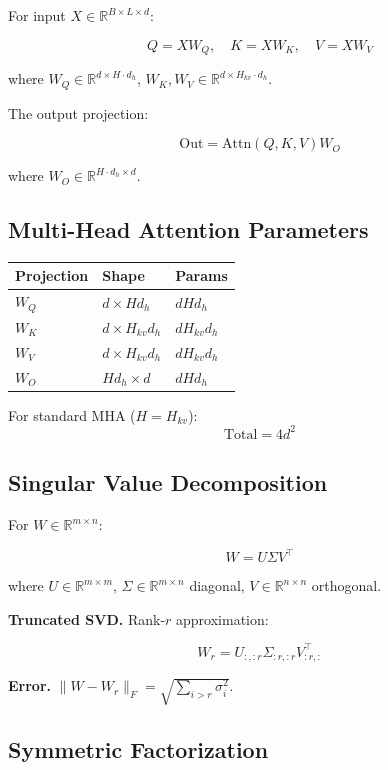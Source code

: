For input $X \in \mathbb{R}^{B \times L \times d}$:

\[
Q = X W_Q, \quad K = X W_K, \quad V = X W_V
\]

where $W_Q \in \mathbb{R}^{d \times H \cdot d_h}$, $W_K, W_V \in \mathbb{R}^{d \times H_{kv} \cdot d_h}$.

The output projection:

\[
\text{Out} = \text{Attn}(Q, K, V) W_O
\]

where $W_O \in \mathbb{R}^{H \cdot d_h \times d}$.

\subsection{Multi-Head Attention Parameters}

\begin{table}[H]
\centering
\small
\begin{tabular}{lll}
\toprule
\textbf{Projection} & \textbf{Shape} & \textbf{Params} \\
\midrule
$W_Q$ & $d \times H d_h$ & $d H d_h$ \\
$W_K$ & $d \times H_{kv} d_h$ & $d H_{kv} d_h$ \\
$W_V$ & $d \times H_{kv} d_h$ & $d H_{kv} d_h$ \\
$W_O$ & $H d_h \times d$ & $d H d_h$ \\
\bottomrule
\end{tabular}
\end{table}

For standard MHA ($H = H_{kv}$):
\[
\text{Total} = 4 d^2
\]

\subsection{Singular Value Decomposition}

For $W \in \mathbb{R}^{m \times n}$:

\[
W = U \Sigma V^\top
\]

where $U \in \mathbb{R}^{m \times m}$, $\Sigma \in \mathbb{R}^{m \times n}$ diagonal, 
$V \in \mathbb{R}^{n \times n}$ orthogonal.

\textbf{Truncated SVD.} Rank-$r$ approximation:

\[
W_r = U_{:, :r} \Sigma_{:r, :r} V_{:r, :}^\top
\]

\textbf{Error.} $\|W - W_r\|_F = \sqrt{\sum_{i > r} \sigma_i^2}$.

\subsection{Symmetric Factorization}

